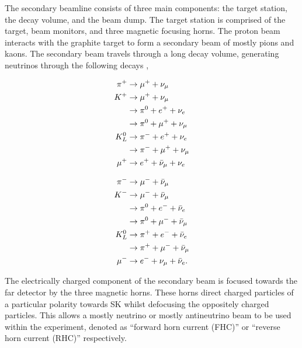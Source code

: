 The secondary beamline consists of three main components: the target station, the decay volume, and the beam dump. The target station is comprised of the target, beam monitors, and three magnetic focusing horns. The proton beam interacts with the graphite target to form a secondary beam of mostly pions and kaons. The secondary beam travels through a  long decay volume, generating neutrinos through the following decays \cite{Abe_2013},

\begin{minipage}{.45\linewidth}
  \begin{equation}
    \begin{split}
      \pi^+ &\rightarrow \mu^+ + \nu_\mu \\
      K^+ &\rightarrow \mu^+ + \nu_\mu \\
      &\rightarrow \pi^0 + e^+ + \nu_e \\
      &\rightarrow \pi^0 + \mu^+ + \nu_\mu \\
      K^0_L &\rightarrow \pi^- + e^+ + \nu_e \\
      &\rightarrow \pi^- + \mu^+ + \nu_\mu \\
      \mu^+ &\rightarrow e^+ + \bar{\nu}_\mu + \nu_e  \notag
    \end{split}
  \end{equation}
\end{minipage}%
\begin{minipage}{.45\linewidth}
  \begin{equation}
    \begin{split}
      \pi^- &\rightarrow \mu^- + \bar{\nu}_\mu\\
      K^- &\rightarrow \mu^- + \bar{\nu}_\mu \\
      &\rightarrow \pi^0 + e^- + \bar{\nu}_e\\
      &\rightarrow \pi^0 + \mu^- + \bar{\nu}_\mu \\
      K^0_L &\rightarrow \pi^+ + e^- + \bar{\nu}_e \\
      &\rightarrow \pi^+ + \mu^- + \bar{\nu}_\mu \\
      \mu^- &\rightarrow e^- + \nu_\mu + \bar{\nu}_e .  \notag
    \end{split}
  \end{equation}
\end{minipage}

The electrically charged component of the secondary beam is focused towards the far detector by the three magnetic horns. These horns direct charged particles of a particular polarity towards SK whilst defocusing the oppositely charged particles. This allows a mostly neutrino or mostly antineutrino beam to be used within the experiment, denoted as ``forward horn current (FHC)'' or ``reverse horn current (RHC)'' respectively.

